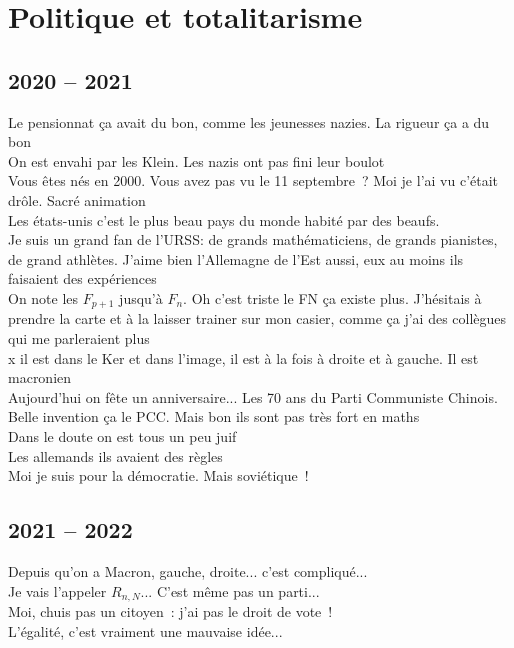 \documentclass[french, a4paper, openany]{book}
\begin{document}
\section*{Politique et totalitarisme}

	\subsection*{2020 -- 2021}
		\noindent \og Le pensionnat ça avait du bon, comme les jeunesses nazies. La rigueur ça a du bon \fg \\
		\og On est envahi par les Klein. Les nazis ont pas fini leur boulot \fg \\
		\og Vous êtes nés en 2000. Vous avez pas vu le 11 septembre~? Moi je l'ai vu c'était drôle. Sacré animation \fg \\
		\og Les états-unis c'est le plus beau pays du monde habité par des beaufs. \fg \\
		\og Je suis un grand fan de l'URSS: de grands mathématiciens, de grands pianistes, de grand athlètes. J'aime bien l'Allemagne de l'Est aussi, eux au moins ils faisaient des expériences \fg \\
		\og On note les $F_{p+1}$ jusqu'à $F_n$. Oh c'est triste le FN ça existe plus. J'hésitais à prendre la carte et à la laisser trainer sur mon casier, comme ça j'ai des collègues qui me parleraient plus \fg \\
		\og x il est dans le Ker et dans l'image, il est à la fois à droite et à gauche. Il est macronien \fg \\
		\og Aujourd'hui on fête un anniversaire... Les 70 ans du Parti Communiste Chinois. Belle invention ça le PCC. Mais bon ils sont pas très fort en maths \fg \\
		\og Dans le doute on est tous un peu juif \fg \\
		\og Les allemands ils avaient des règles \fg \\
		\og Moi je suis pour la démocratie. Mais soviétique~! \fg \\

	\subsection*{2021 -- 2022}
	
		\noindent \og Depuis qu'on a Macron, gauche, droite... c'est compliqué... \fg \\
		\og Je vais l'appeler $R_{n,N}$... C'est même pas un parti... \fg \\
		\og Moi, chuis pas un citoyen~: j'ai pas le droit de vote~! \fg \\
		\og L'égalité, c'est vraiment une mauvaise idée... \fg \\
\end{document}
